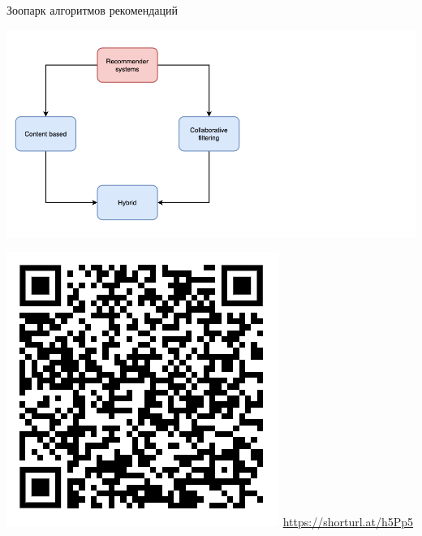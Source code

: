 \documentclass[11pt,aspectratio=169]{beamer}
\begin{document}
\begin{frame}{Зоопарк алгоритмов рекомендаций \cite{ali_2021}}

\begin{center}
\includegraphics[scale=0.27]{images/taxonomy-1.png}
\end{center}

\includegraphics[scale=0.3]{images/poll.png} \hfill \url{https://shorturl.at/h5Pp5}

\end{frame}
\end{document}
